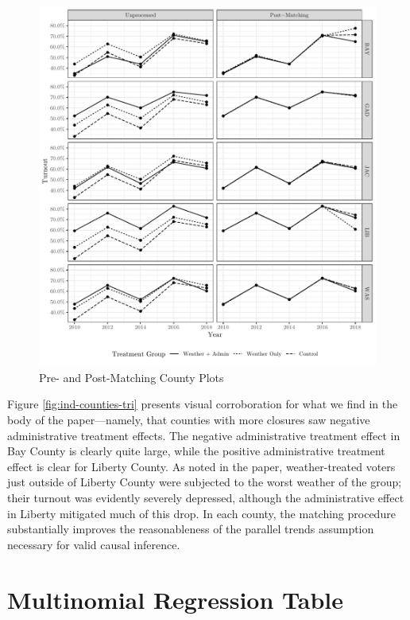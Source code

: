 \documentclass[
  12pt,
]{article}
\begin{document}
\begin{figure}[H]

{\centering \includegraphics{si_files/figure-latex/indcs-chunk-tr-1} 

}

\caption{\label{fig:ind-counties-tri}Pre- and Post-Matching County Plots}\label{fig:indcs-chunk-tr}
\end{figure}

Figure \ref{fig:ind-counties-tri} presents visual corroboration for what we find in the body of the paper---namely, that counties with more closures saw negative administrative treatment effects. The negative administrative treatment effect in Bay County is clearly quite large, while the positive administrative treatment effect is clear for Liberty County. As noted in the paper, weather-treated voters just outside of Liberty County were subjected to the worst weather of the group; their turnout was evidently severely depressed, although the administrative effect in Liberty mitigated much of this drop. In each county, the matching procedure substantially improves the reasonableness of the parallel trends assumption necessary for valid causal inference.

\hypertarget{multinomial-regression-table}{%
\section*{Multinomial Regression Table}\label{multinomial-regression-table}}
\end{document}
